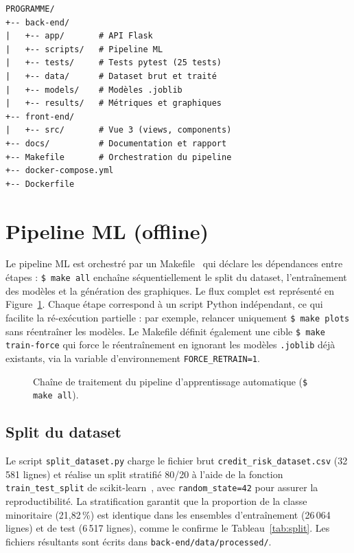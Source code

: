 \documentclass[12pt,a4paper,openany]{report}
\newcommand{\file}[1]{\texttt{#1}}
\newcommand{\cmd}[1]{\texttt{\$ #1}}
\begin{document}
\begin{small}
\begin{verbatim}
PROGRAMME/
+-- back-end/
|   +-- app/       # API Flask
|   +-- scripts/   # Pipeline ML
|   +-- tests/     # Tests pytest (25 tests)
|   +-- data/      # Dataset brut et traité
|   +-- models/    # Modèles .joblib
|   +-- results/   # Métriques et graphiques
+-- front-end/
|   +-- src/       # Vue 3 (views, components)
+-- docs/          # Documentation et rapport
+-- Makefile       # Orchestration du pipeline
+-- docker-compose.yml
+-- Dockerfile
\end{verbatim}
\end{small}

\section{Pipeline ML (offline)}

Le pipeline ML est orchestré par un Makefile~\cite{gnumake} qui déclare les dépendances entre étapes : \cmd{make all} enchaîne séquentiellement le split du dataset, l'entraînement des modèles et la génération des graphiques. Le flux complet est représenté en Figure~\ref{fig:pipeline}. Chaque étape correspond à un script Python indépendant, ce qui facilite la ré-exécution partielle : par exemple, relancer uniquement \cmd{make plots} sans réentraîner les modèles. Le Makefile définit également une cible \cmd{make train-force} qui force le réentraînement en ignorant les modèles \texttt{.joblib} déjà existants, via la variable d'environnement \texttt{FORCE\_RETRAIN=1}.

\begin{figure}[H]
    \centering
    
    \caption{Chaîne de traitement du pipeline d'apprentissage automatique (\cmd{make all}).}
    \label{fig:pipeline}
\end{figure}

\subsection{Split du dataset}

Le script \file{split\_dataset.py} charge le fichier brut \file{credit\_risk\_dataset.csv} (32\,581 lignes) et réalise un split stratifié 80/20 à l'aide de la fonction \texttt{train\_test\_split} de scikit-learn~\cite{scikit-learn}, avec \texttt{random\_state=42} pour assurer la reproductibilité. La stratification garantit que la proportion de la classe minoritaire (21,82\,\%) est identique dans les ensembles d'entraînement (26\,064 lignes) et de test (6\,517 lignes), comme le confirme le Tableau~\ref{tab:split}. Les fichiers résultants sont écrits dans \file{back-end/data/processed/}.
\end{document}
